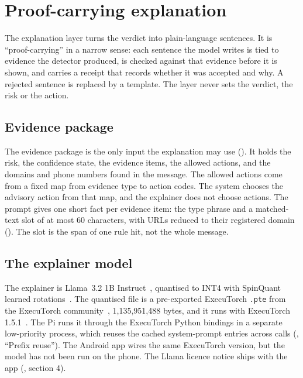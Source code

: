 \section{Proof-carrying explanation}
\label{sec:explanation}

The explanation layer turns the verdict into plain-language sentences. It is ``proof-carrying'' in a narrow sense: each sentence the model writes is tied to evidence the detector produced, is checked against that evidence before it is shown, and carries a receipt that records whether it was accepted and why. A rejected sentence is replaced by a template. The layer never sets the verdict, the risk or the action.

\subsection{Evidence package}
\label{sec:package}

The evidence package is the only input the explanation may use (). It holds the risk, the confidence state, the evidence items, the allowed actions, and the domains and phone numbers found in the message. The allowed actions come from a fixed map from evidence type to action codes. The system chooses the advisory action from that map, and the explainer does not choose actions. The prompt gives one short fact per evidence item: the type phrase and a matched-text slot of at most 60 characters, with URLs reduced to their registered domain (). The slot is the span of one rule hit, not the whole message.

\subsection{The explainer model}
\label{sec:llm}

The explainer is Llama~3.2 1B Instruct~\cite{llama32}, quantised to INT4 with SpinQuant learned rotations~\cite{spinquant}. The quantised file is a pre-exported ExecuTorch \texttt{.pte} from the ExecuTorch community~\cite{etcommunity}, 1,135,951,488 bytes, and it runs with ExecuTorch 1.5.1~\cite{executorch}. The Pi runs it through the ExecuTorch Python bindings in a separate low-priority process, which reuses the cached system-prompt entries across calls (, ``Prefix reuse''). The Android app wires the same ExecuTorch version, but the model has not been run on the phone. The Llama licence notice ships with the app (, section 4).

